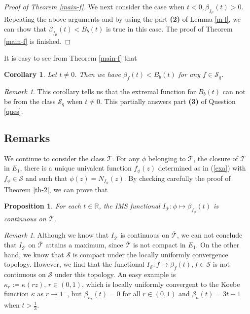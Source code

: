 \documentclass[11pt]{amsart}
\newtheorem{proposition}[theorem]{Proposition}
\newtheorem{corollary}[theorem]{Corollary}
\theoremstyle{remark}
\newtheorem{remark}[theorem]{Remark}
\theoremstyle{claim}
\theoremstyle{definition}
\theoremstyle{problem}
\theoremstyle{conjecture}
\theoremstyle{question}
\numberwithin{equation}{section}
\begin{document}
\begin{proof}[Proof of Theorem \ref{main-f}]
We next consider the case when $t<0, \beta_{f_{\mu}}(t)>0$. Repeating the above arguments and by using the part {\bf (2)} of Lemma \ref{m-l}, we can show that $\beta_{f_{\mu}}(t)<B_b(t)$ is true in this case. The proof of Theorem \ref{main-f} is finished.   
\end{proof}

It is easy to see from Theorem \ref{main-f} that
\begin{corollary}\label{cor}
Let $t \neq 0$. Then we have  $\beta_f(t)<B_b(t)$ for any $f\in \mathcal{S}_q$.
\end{corollary}
\begin{remark}
This corollary tells us that the extremal function for $B_b(t)$ can not be from the class $\mathcal{S}_q$ when $t\neq 0$. This partially answers part {\bf (3)} of Question \ref{ques}.
\end{remark}

\subsection{Remarks}

We continue to consider the class ${\mathcal{T}}$.  For any $\phi$ belonging to $\overline{{\mathcal{T}}}$, the closure of ${{\mathcal{T}}}$ in $E_1$, there is a unique univalent function $f_{\phi}(z)$ determined as in (\ref{exa}) with $f_{\phi}\in \mathcal{S}$ and such that
$\phi(z)=N_{f_{\phi}}(z).$ By checking carefully the proof of Theorem \ref{th-2}, we can prove that
 \begin{proposition}\label{Curve}
For each $t\in\mathbb{R}$, the IMS functional $I_{\overline{\mathcal{T}}}: \phi\mapsto \beta_{f_{\phi}}(t)$ is continuous on $\overline{\mathcal{T}}$.
  \end{proposition}
  
  \begin{remark}
 Although we know that $I_{\overline{\mathcal{T}}}$ is continuous on $\overline{\mathcal{T}}$, we can not conclude that  $I_{\overline{\mathcal{T}}}$ on $\overline{\mathcal{T}}$ attains a maximum, since $\overline{\mathcal{T}}$ is not compact in $E_1$.  On the other hand, we know that $\mathcal{S}$ is compact under the locally uniformly convergence topology. However, we find that the functional $I_{\mathcal{S}}: f \mapsto \beta_f(t), f\in \mathcal{S}$ is not continuous on $\mathcal{S}$ under this topology. An  easy example is $\kappa_r:=\kappa(rz), \, r\in (0,1)$, which is locally uniformly convergent to the Koebe function $\kappa$ as $r\rightarrow 1^{-}$, but $\beta_{\kappa_r}(t)=0$ for all $r\in (0,1)$ and $\beta_{\kappa}(t)=3t-1$ when $t>\frac{1}{3}$.
 \end{remark}
\end{document}
